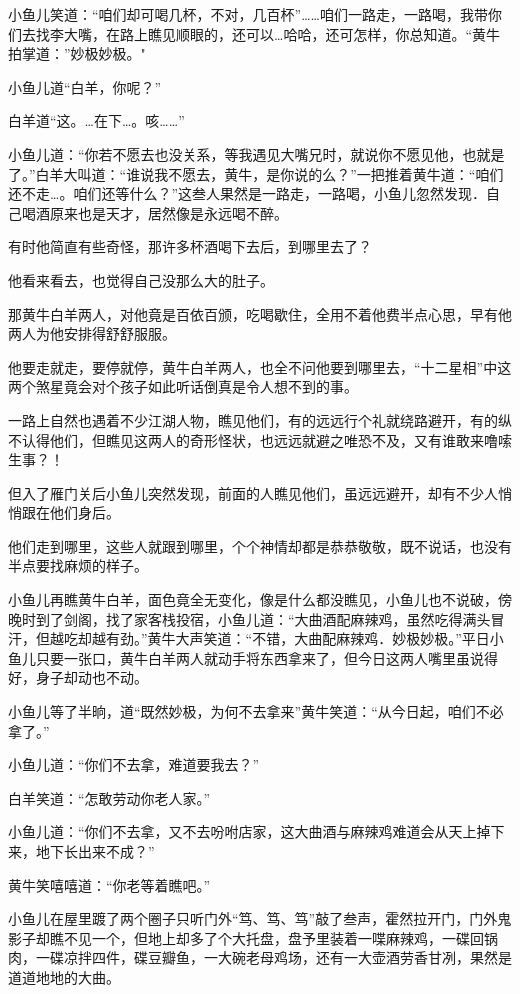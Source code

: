 \documentclass[12pt,oneside]{book}
\begin{document}
小鱼儿笑道：``咱们却可喝几杯，不对，几百杯''\ldots\ldots 咱们一路走，一路喝，我带你们去找李大嘴，在路上瞧见顺眼的，还可以\ldots 哈哈，还可怎样，你总知道。``黄牛拍掌道：''妙极妙极。"

小鱼儿道``白羊，你呢？''

白羊道``这。\ldots 在下\ldots。咳\ldots\ldots{}''

小鱼儿道：``你若不愿去也没关系，等我遇见大嘴兄时，就说你不愿见他，也就是了。''白羊大叫道：``谁说我不愿去，黄牛，是你说的么？''一把推着黄牛道：``咱们还不走\ldots。咱们还等什么？''这叁人果然是一路走，一路喝，小鱼儿忽然发现．自己喝酒原来也是天才，居然像是永远喝不醉。

有时他简直有些奇怪，那许多杯酒喝下去后，到哪里去了？

他看来看去，也觉得自己没那么大的肚子。

那黄牛白羊两人，对他竟是百依百颁，吃喝歇住，全用不着他费半点心思，早有他两人为他安排得舒舒服服。

他要走就走，要停就停，黄牛白羊两人，也全不问他要到哪里去，``十二星相''中这两个煞星竟会对个孩子如此听话倒真是令人想不到的事。

一路上自然也遇着不少江湖人物，瞧见他们，有的远远行个礼就绕路避开，有的纵不认得他们，但瞧见这两人的奇形怪状，也远远就避之唯恐不及，又有谁敢来噜嗦生事？！

但入了雁门关后小鱼儿突然发现，前面的人瞧见他们，虽远远避开，却有不少人悄悄跟在他们身后。

他们走到哪里，这些人就跟到哪里，个个神情却都是恭恭敬敬，既不说话，也没有半点要找麻烦的样子。

小鱼儿再瞧黄牛白羊，面色竟全无变化，像是什么都没瞧见，小鱼儿也不说破，傍晚时到了剑阁，找了家客栈投宿，小鱼儿道：``大曲酒配麻辣鸡，虽然吃得满头冒汗，但越吃却越有劲。''黄牛大声笑道：``不错，大曲配麻辣鸡．妙极妙极。''平日小鱼儿只要一张口，黄牛白羊两人就动手将东西拿来了，但今日这两人嘴里虽说得好，身子却动也不动。

小鱼儿等了半晌，道``既然妙极，为何不去拿来''黄牛笑道：``从今日起，咱们不必拿了。''

小鱼儿道：``你们不去拿，难道要我去？''

白羊笑道：``怎敢劳动你老人家。''

小鱼儿道：``你们不去拿，又不去吩咐店家，这大曲酒与麻辣鸡难道会从天上掉下来，地下长出来不成？''

黄牛笑嘻嘻道：``你老等着瞧吧。''

小鱼儿在屋里踱了两个圈子只听门外``笃、笃、笃''敲了叁声，霍然拉开门，门外鬼影子却瞧不见一个，但地上却多了个大托盘，盘予里装着一喋麻辣鸡，一碟回锅肉，一碟凉拌四件，碟豆瓣鱼，一大碗老母鸡场，还有一大壶酒劳香甘冽，果然是道道地地的大曲。
\end{document}

